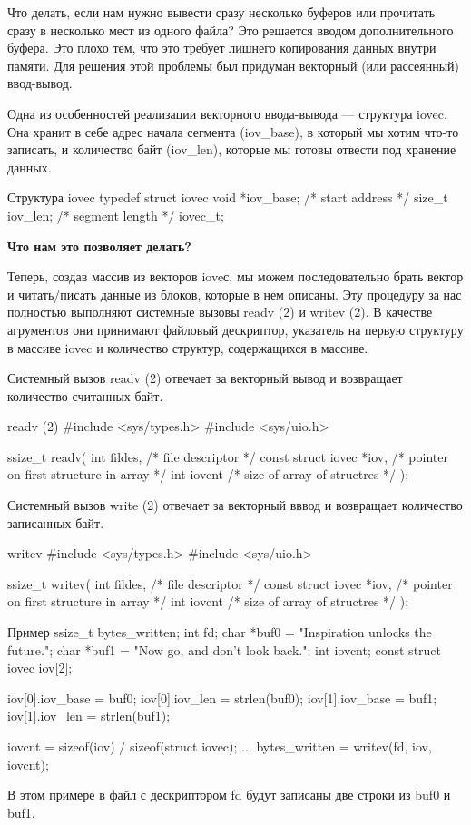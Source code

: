 Что делать, если нам нужно вывести сразу несколько буферов или прочитать сразу в несколько мест из одного файла? Это решается вводом дополнительного буфера. Это плохо тем, что это требует лишнего копирования данных внутри памяти. Для решения этой проблемы был придуман векторный (или рассеянный) ввод-вывод.

Одна из особенностей реализации векторного ввода-вывода --- структура iovec. Она хранит в себе адрес начала сегмента (iov\_base), в который мы хотим что-то записать, и количество байт (iov\_len), которые мы готовы отвести под хранение данных.

\begin{CCode}{Структура iovec}
	typedef struct iovec { 
		void *iov_base;  	/* start address */ 
		size_t iov_len; 	/* segment length */ 
	} iovec_t; \end{CCode}

\textbf{Что нам это позволяет делать?}

Теперь, создав массив из векторов ioveс, мы можем последовательно брать вектор и читать/писать данные из блоков, которые в нем описаны.
Эту процедуру за нас полностью выполняют системные вызовы readv (2) и writev (2). В качестве агрументов они принимают файловый дескриптор, указатель на первую структуру в массиве iovec и количество структур, содержащихся в массиве. 

Системный вызов readv (2) отвечает за векторный вывод и возвращает количество считанных байт.

\begin{CCode}{readv (2)}
	#include <sys/types.h>
	#include <sys/uio.h>

	ssize_t readv(
		int fildes, 				/* file descriptor */ 
		const struct iovec *iov, 	/* pointer on first structure in array */ 
		int iovcnt 					/* size of array of structres */ 
	); \end{CCode}

Системный вызов write (2) отвечает за векторный вввод и возвращает количество записанных байт.

\begin{CCode}{writev}
	#include <sys/types.h>
	#include <sys/uio.h>

	ssize_t writev(
		int fildes, 				/* file descriptor */ 
		const struct iovec *iov, 	/* pointer on first structure in array */ 
		int iovcnt 					/* size of array of structres */ 
	); \end{CCode}

\begin{CCode}{Пример}
	ssize_t bytes_written;
	int fd;
	char *buf0 = "Inspiration unlocks the future.\n";
	char *buf1 = "Now go, and don't look back.\n";
	int iovcnt;
	const struct iovec iov[2];

	iov[0].iov_base = buf0;
	iov[0].iov_len = strlen(buf0);
	iov[1].iov_base = buf1;
	iov[1].iov_len = strlen(buf1);
	
	iovcnt = sizeof(iov) / sizeof(struct iovec);
		...
	bytes_written = writev(fd, iov, iovcnt); \end{CCode}

В этом примере в файл с дескриптором fd будут записаны две строки из buf0 и buf1.
